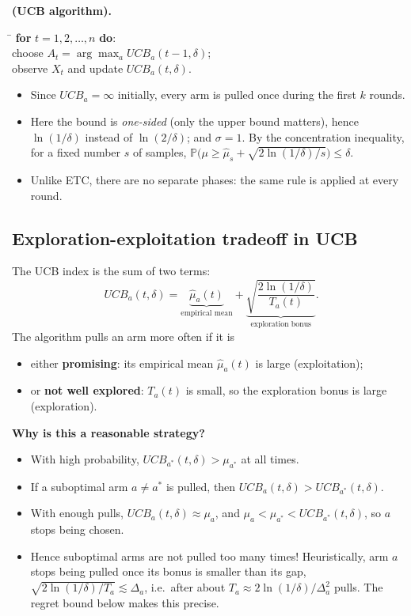 \begin{definition}\textbf{(UCB algorithm).}
\begin{tabbing}
\hspace{1.5em}\=\kill
\textbf{for} $t = 1, 2, \dots, n$ \textbf{do}: \\
\> choose $A_t = \arg\max_a UCB_a(t-1, \delta)$; \\
\> observe $X_t$ and update $UCB_a(t, \delta)$.
\end{tabbing}
\end{definition}

\begin{remark}
\begin{itemize}
    \item Since $UCB_a = \infty$ initially, every arm is pulled once during the first $k$ rounds.
    \item Here the bound is \emph{one-sided} (only the upper bound matters), hence $\ln(1/\delta)$ instead of $\ln(2/\delta)$; and $\sigma = 1$. By the concentration inequality, for a fixed number $s$ of samples, $\mathbb{P}\big(\mu \geq \hat{\mu}_s + \sqrt{2\ln(1/\delta)/s}\big) \leq \delta$.
    \item Unlike ETC, there are no separate phases: the same rule is applied at every round.
\end{itemize}
\end{remark}

\subsection{Exploration-exploitation tradeoff in UCB}

The UCB index is the sum of two terms:
\[
UCB_a(t, \delta) = \underbrace{\hat{\mu}_a(t)}_{\text{empirical mean}} + \underbrace{\sqrt{\frac{2\ln(1/\delta)}{T_a(t)}}}_{\text{exploration bonus}}.
\]
The algorithm pulls an arm more often if it is
\begin{itemize}
    \item either \textbf{promising}: its empirical mean $\hat{\mu}_a(t)$ is large (exploitation);
    \item or \textbf{not well explored}: $T_a(t)$ is small, so the exploration bonus is large (exploration).
\end{itemize}

\textbf{Why is this a reasonable strategy?}
\begin{itemize}
    \item With high probability, $UCB_{a^*}(t, \delta) > \mu_{a^*}$ at all times.
    \item If a suboptimal arm $a \neq a^*$ is pulled, then $UCB_a(t, \delta) > UCB_{a^*}(t, \delta)$.
    \item With enough pulls, $UCB_a(t, \delta) \approx \mu_a$, and $\mu_a < \mu_{a^*} < UCB_{a^*}(t, \delta)$, so $a$ stops being chosen.
    \item Hence suboptimal arms are not pulled too many times! Heuristically, arm $a$ stops being pulled once its bonus is smaller than its gap, $\sqrt{2\ln(1/\delta)/T_a} \lesssim \Delta_a$, i.e.\ after about $T_a \approx 2\ln(1/\delta)/\Delta_a^2$ pulls. The regret bound below makes this precise.
\end{itemize}


